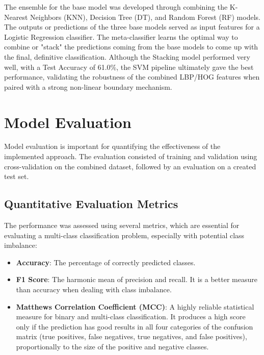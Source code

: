 The ensemble for the base model was developed through combining the K-Nearest Neighbors (KNN), Decision Tree (DT), and Random Forest (RF) models.
The outputs or predictions of the three base models served as input features for a Logistic Regression classifier. The meta-classifier learns the optimal way to combine or "stack" the predictions coming from the base models to come up with the final, definitive classification. Although the Stacking model performed very well, with a Test Accuracy of 61.0\%, the SVM pipeline ultimately gave the best performance, validating the robustness of the combined LBP/HOG features when paired with a strong non-linear boundary mechanism.
\newline

\chapter{Model Evaluation}

Model evaluation is important for quantifying the effectiveness of the implemented approach. The evaluation consisted of training and validation using cross-validation on the combined dataset, followed by an evaluation on a created test set.
\newline

\section{Quantitative Evaluation Metrics}

The performance was assessed using several metrics, which are essential for evaluating a multi-class classification problem, especially with potential class imbalance:

\begin{itemize}
	\item \textbf{Accuracy}: The percentage of correctly predicted classes.
	\item \textbf{F1 Score}: The harmonic mean of precision and recall. It is a better measure than accuracy when dealing with class imbalance.
	\item \textbf{Matthews Correlation Coefficient (MCC)}: A highly reliable statistical measure for binary and multi-class classification. It produces a high score only if the prediction has good results in all four categories of the confusion matrix (true positives, false negatives, true negatives, and false positives), proportionally to the size of the positive and negative classes.
\end{itemize}

